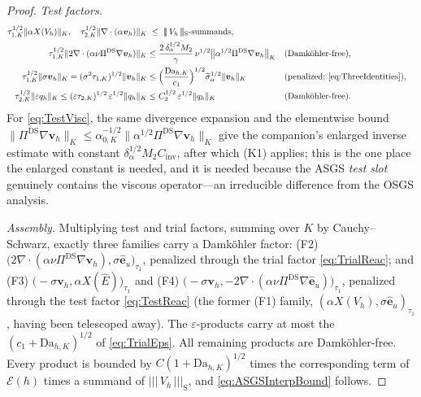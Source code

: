 \documentclass[11pt]{article}
\theoremstyle{remark}
\newcommand{\bv}{\boldsymbol{v}}
\newcommand{\ViscProj}{\Pi^{\mathrm{DS}}}
\newcommand{\normK}[1]{\lVert #1 \rVert_{K}}
\newcommand{\tnorm}[1]{\lvert\!\lvert\!\lvert\, #1 \,\rvert\!\rvert\!\rvert}
\newcommand{\Dah}{\mathrm{Da}_{h,K}}
\newcommand{\st}{\widetilde{\sigma}_\alpha}
\newcommand{\EF}{\mathcal{E}}
\begin{document}
\begin{proof}
\smallskip\noindent\emph{Test factors.}
\begin{align}
  \tau_{1,K}^{1/2}\normK{\alpha X(V_h)},\quad
  \tau_{2,K}^{1/2}\normK{\nabla\cdot(\alpha\bv_h)}
  &\;\le\; \tnorm{V_h}_{\mathrm{S}}\text{-summands},
  \label{eq:TestFirst}\\
  \tau_{1,K}^{1/2}\normK{2\nabla\cdot(\alpha\nu\ViscProj\nabla\bv_h)}
  &\le \frac{2\,\delta_\alpha^{1/2} M_2}{\gamma}\,
  \nu^{1/2}\bigl\lVert \alpha^{1/2}\ViscProj\nabla\bv_h \bigr\rVert_K
  && \text{(Damk\"ohler-free)},
  \label{eq:TestVisc}\\
  \tau_{1,K}^{1/2}\normK{\sigma\bv_h}
  = (\sigma^2\tau_{1,K})^{1/2}\normK{\bv_h}
  &\le \Bigl(\frac{\Dah}{c_1}\Bigr)^{1/2} \st^{1/2}\normK{\bv_h}
  && \text{(penalized; \cref{eq:ThreeIdentities})},
  \label{eq:TestReac}\\
  \tau_{2,K}^{1/2}\normK{\varepsilon q_h}
  \le (\varepsilon\tau_{2,K})^{1/2}\,\varepsilon^{1/2}\normK{q_h}
  &\le C_2^{1/2}\,\varepsilon^{1/2}\normK{q_h}
  && \text{(Damk\"ohler-free)}.
  \label{eq:TestEps}
\end{align}
For \cref{eq:TestVisc}, the same divergence expansion and the elementwise bound
$\normK{\ViscProj\nabla\bv_h} \le \alpha_{0,K}^{-1/2}
\normK{\alpha^{1/2}\ViscProj\nabla\bv_h}$ give the companion's enlarged inverse
estimate with constant $\delta_\alpha^{1/2}M_2 C_{\mathrm{inv}}$, after which (K1)
applies; this is the one place the enlarged constant is needed, and it is needed
because the ASGS \emph{test slot} genuinely contains the viscous operator---an
irreducible difference from the OSGS analysis.

\smallskip\noindent\emph{Assembly.}
Multiplying test and trial factors, summing over $K$ by Cauchy--Schwarz, exactly
three families carry a Damk\"ohler factor: (F2)
$\bigl(2\nabla\cdot(\alpha\nu\ViscProj\nabla\bv_h),
\sigma\hat{\boldsymbol e}_u\bigr)_{\tau_1}$, penalized through the trial factor
\cref{eq:TrialReac}; and (F3) $\bigl(-\sigma\bv_h, \alpha X(\hat E)\bigr)_{\tau_1}$
and (F4) $\bigl(-\sigma\bv_h,
-2\nabla\cdot(\alpha\nu\ViscProj\nabla\hat{\boldsymbol e}_u)\bigr)_{\tau_1}$,
penalized through the test factor \cref{eq:TestReac} (the former (F1) family,
$(\alpha X(V_h), \sigma\hat{\boldsymbol e}_u)_{\tau_1}$, having been telescoped
away). The
$\varepsilon$-products carry at most the $(c_1+\Dah)^{1/2}$ of \cref{eq:TrialEps}.
All remaining products are Damk\"ohler-free. Every product is bounded by
$C(1+\Dah)^{1/2}$ times the corresponding term of $\EF(h)$ times a summand of
$\tnorm{V_h}_{\mathrm{S}}$, and \cref{eq:ASGSInterpBound} follows.
\end{proof}
\end{document}
